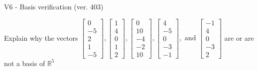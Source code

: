 \begin{exercise}
  \begin{exerciseTitle}V6 - Basis verification (ver. 403)\end{exerciseTitle}
  \begin{exerciseStatement}
    Explain why the vectors \(\left[\begin{array}{r}
0 \\
-5 \\
2 \\
1 \\
-5
\end{array}\right] , \left[\begin{array}{r}
1 \\
4 \\
0 \\
1 \\
2
\end{array}\right] , \left[\begin{array}{r}
0 \\
10 \\
-4 \\
-2 \\
10
\end{array}\right] , \left[\begin{array}{r}
4 \\
-5 \\
0 \\
-3 \\
-1
\end{array}\right] , \text{ and } \left[\begin{array}{r}
-1 \\
4 \\
0 \\
-3 \\
2
\end{array}\right]\) are or are not a basis of \(\mathbb{R}^5\)	



\end{exerciseStatement}
\end{exercise}
